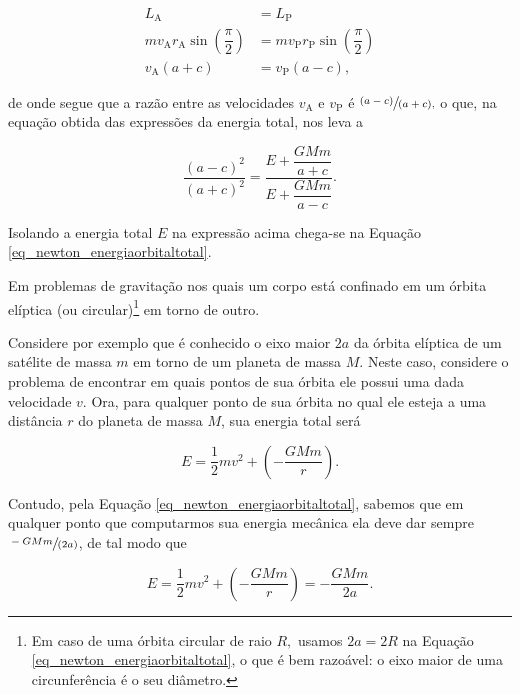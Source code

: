 \begin{align}
    L_\text{A} &=  L_\text{P} \nonumber \\
    mv_\text{A}r_\text{A} \sin \left( \dfrac{\pi}{2} \right) &=   mv_\text{P}r_\text{P} \sin \left( \dfrac{\pi}{2} \right) \nonumber \\
    v_\text{A} (a+c) & = v_\text{P} (a-c), \nonumber
\end{align}

\noindent de onde segue que a razão entre as velocidades $v_\text{A}$ e $v_\text{P}$ é $\sfrac{(a-c)}{(a+c),}$ o que, na equação obtida das expressões da energia total, nos leva a


$$ \dfrac{(a-c)^2}{(a+c)^2} = \dfrac{E + \dfrac{GMm}{a+c} }{E + \dfrac{GMm}{a-c}}.$$

Isolando a energia total $E$ na expressão acima chega-se na Equação \eqref{eq_newton_energiaorbitaltotal}.








Em problemas de gravitação nos quais um corpo está confinado em um órbita elíptica (ou circular)\footnote{Em caso de uma órbita circular de raio $R,$ usamos $2a=2R$ na Equação \eqref{eq_newton_energiaorbitaltotal}, o que é bem razoável: o eixo maior de uma circunferência é o seu diâmetro.} em torno de outro. 

Considere por exemplo que é conhecido o eixo maior $2a$ da órbita elíptica de um satélite de massa $m$ em torno de um planeta de massa $M.$ Neste caso, considere o problema de encontrar em quais pontos de sua órbita ele possui uma dada velocidade $v$. Ora, para qualquer ponto de sua órbita no qual ele esteja a uma distância $r$ do planeta de massa $M$, sua energia total será

$$ E = \dfrac{1}{2}mv^2 + \left( - \dfrac{GMm}{r} \right). $$

Contudo, pela Equação \eqref{eq_newton_energiaorbitaltotal}, sabemos que em qualquer ponto que computarmos sua energia mecânica ela deve dar sempre $\sfrac{-GMm}{(2a)}$, de tal modo que

$$ E = \dfrac{1}{2}mv^2 + \left( - \dfrac{GMm}{r} \right) = -\dfrac{GMm}{2a}. $$

